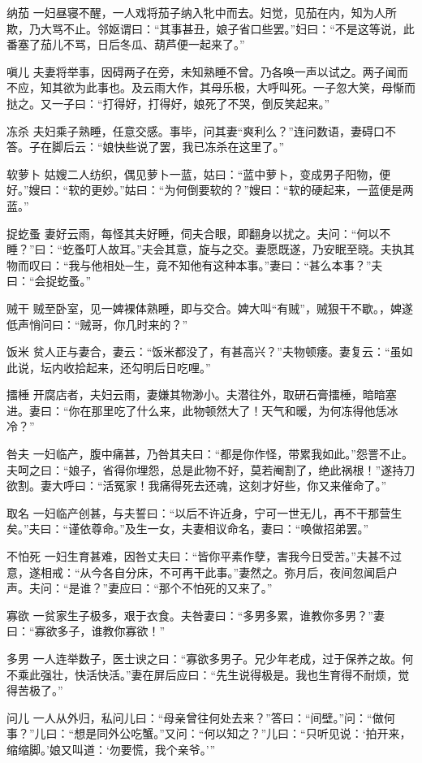 \documentclass[12pt,UTF8]{ctexbook}
\begin{document}
纳茄
一妇昼寝不醒，一人戏将茄子纳入牝中而去。妇觉，见茄在内，知为人所欺，乃大骂不止。邻妪谓曰：“其事甚丑，娘子省口些罢。”妇曰：“不是这等说，此番塞了茄儿不骂，日后冬瓜、葫芦便一起来了。”

嗔儿
夫妻将举事，因碍两子在旁，未知熟睡不曾。乃各唤一声以试之。两子闻而不应，知其欲为此事也。及云雨大作，其母乐极，大呼叫死。一子忽大笑，母惭而挞之。又一子曰：“打得好，打得好，娘死了不哭，倒反笑起来。”

冻杀
夫妇乘子熟睡，任意交感。事毕，问其妻“爽利么？”连问数语，妻碍口不答。子在脚后云：“娘快些说了罢，我已冻杀在这里了。”

软萝卜
姑嫂二人纺织，偶见萝卜一蓝，姑曰：“蓝中萝卜，变成男子阳物，便好。”嫂曰：“软的更妙。”姑曰：“为何倒要软的？”嫂曰：“软的硬起来，一蓝便是两蓝。”

捉虼蚤
妻好云雨，每怪其夫好睡，伺夫合眼，即翻身以扰之。夫问：“何以不睡？”曰：“虼蚤叮人故耳。”夫会其意，旋与之交。妻愿既遂，乃安眠至晓。夫执其物而叹曰：“我与他相处─生，竟不知他有这种本事。”妻曰：“甚么本事？”夫曰：“会捉虼蚤。”

贼干
贼至卧室，见一婢裸体熟睡，即与交合。婢大叫“有贼”，贼狠干不歇。，婢遂低声悄问曰：“贼哥，你几时来的？”

饭米
贫人正与妻合，妻云：“饭米都没了，有甚高兴？”夫物顿痿。妻复云：“虽如此说，坛内收拾起来，还勾明后日吃哩。”

擂棰
开腐店者，夫妇云雨，妻嫌其物渺小。夫潜往外，取研石膏擂棰，暗暗塞进。妻曰：“你在那里吃了什么来，此物顿然大了！天气和暖，为何冻得他恁冰冷？”

咎夫
一妇临产，腹中痛甚，乃咎其夫曰：“都是你作怪，带累我如此。”怨詈不止。夫呵之曰：“娘子，省得你埋怨，总是此物不好，莫若阉割了，绝此祸根！”遂持刀欲割。妻大呼曰：“活冤家！我痛得死去还魂，这刻才好些，你又来催命了。”

取名
一妇临产创甚，与夫誓曰：“以后不许近身，宁可一世无儿，再不干那营生矣。”夫曰：“谨依尊命。”及生一女，夫妻相议命名，妻曰：“唤做招弟罢。”

不怕死
一妇生育甚难，因咎丈夫曰：“皆你平素作孽，害我今日受苦。”夫甚不过意，遂相戒：“从今各自分床，不可再干此事。”妻然之。弥月后，夜间忽闻启户声。夫问：“是谁？”妻应曰：“那个不怕死的又来了。”

寡欲
一贫家生子极多，艰于衣食。夫咎妻曰：“多男多累，谁教你多男？”妻曰：“寡欲多子，谁教你寡欲！”

多男
一人连举数子，医士谀之曰：“寡欲多男子。兄少年老成，过于保养之故。何不乘此强壮，快活快活。”妻在屏后应曰：“先生说得极是。我也生育得不耐烦，觉得苦极了。”

问儿
一人从外归，私问儿曰：“母亲曾往何处去来？”答曰：“间壁。”问：“做何事？”儿曰：“想是同外公吃蟹。”又问：“何以知之？”儿曰：“只听见说：‘拍开来，缩缩脚。’娘又叫道：‘勿要慌，我个亲爷。’”
\end{document}
